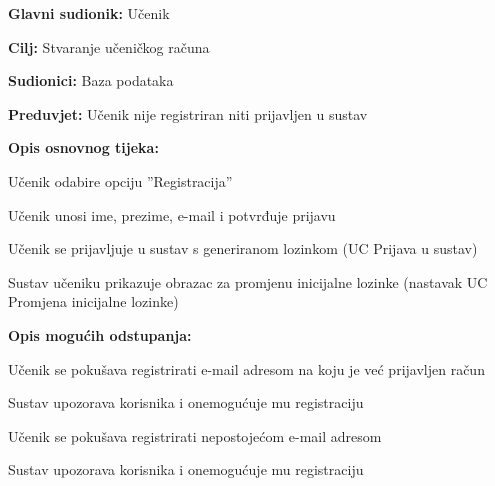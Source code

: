 					\noindent {}
					\begin{packed_item}
	
						\item \textbf{Glavni sudionik:} Učenik
						\item  \textbf{Cilj:} Stvaranje učeničkog računa
						\item  \textbf{Sudionici:} Baza podataka
						\item  \textbf{Preduvjet:} Učenik nije registriran niti prijavljen u sustav
						\item  \textbf{Opis osnovnog tijeka:}
						
						\item[] \begin{packed_enum}
	
							\item Učenik odabire opciju ”Registracija”
							\item Učenik unosi ime, prezime, e-mail i potvrđuje prijavu
							\item Učenik se prijavljuje u sustav s generiranom lozinkom (UC Prijava u sustav)							
							\item Sustav učeniku prikazuje obrazac za promjenu inicijalne lozinke (nastavak UC Promjena inicijalne lozinke)
						\end{packed_enum}
						
						\item  \textbf{Opis mogućih odstupanja:}
						
						\item[] \begin{packed_item}
	
							\item[2.a]Učenik se pokušava registrirati e-mail adresom na koju je već prijavljen račun
							\item[] \begin{packed_enum}
								
								\item Sustav upozorava korisnika i onemogućuje mu registraciju							
							\end{packed_enum}

							\item[2.b] Učenik se pokušava registrirati nepostojećom e-mail adresom
							\item[] \begin{packed_enum}
								
								\item Sustav upozorava korisnika i onemogućuje mu registraciju 								
							\end{packed_enum}
							
						\end{packed_item}
					\end{packed_item}

